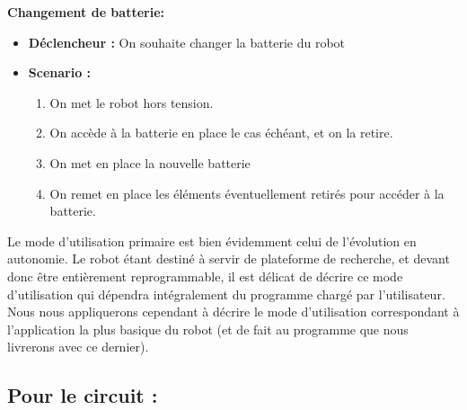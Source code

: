 	\textbf{Changement de batterie:}
	\begin{itemize}
		\item \textbf{Déclencheur :} On souhaite changer la batterie du robot
		\item \textbf{Scenario :}
		\begin{enumerate}
			\item On met le robot hors tension.
			\item On accède à la batterie en place le cas échéant, et on la retire.
			\item On met en place la nouvelle batterie
			\item On remet en place les éléments éventuellement retirés pour accéder à la batterie.
		\end{enumerate}
	\end{itemize}


	Le mode d'utilisation primaire est bien évidemment celui de l'évolution en autonomie. Le robot étant destiné à servir de plateforme de recherche, et devant donc être entièrement reprogrammable, il est délicat de décrire ce mode d'utilisation qui dépendra intégralement du programme chargé par l'utilisateur.\\

	Nous nous appliquerons cependant à décrire le mode d'utilisation correspondant à l'application la plus basique du robot (et de fait au programme que nous livrerons avec ce dernier).

	
\subsection{Pour le circuit :}

